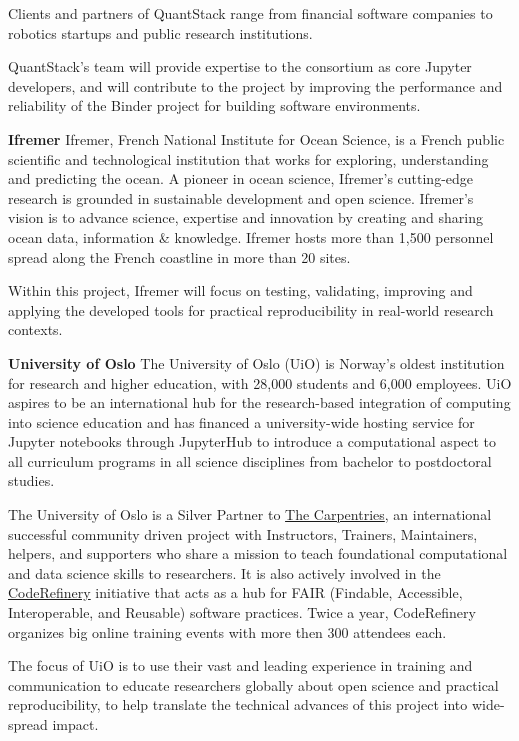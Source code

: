 Clients and partners of QuantStack range from financial software companies to robotics
startups and public research institutions.

QuantStack's team will provide expertise to the consortium as core Jupyter developers,
and will contribute to the project by improving the performance and reliability of the
Binder project for building software environments.

\noindent \textbf{Ifremer}
Ifremer, French National Institute for Ocean Science, is a French public
scientific and technological institution that works for exploring, understanding
and predicting the ocean. A pioneer in ocean science, Ifremer's cutting-edge
research is grounded in sustainable development and open science. Ifremer's
vision is to advance science, expertise and innovation by creating and sharing
ocean data, information \& knowledge. Ifremer hosts more than 1,500 personnel
spread along the French coastline in more than 20 sites.

Within this project, Ifremer will focus on testing, validating, improving and
applying the developed
tools for practical reproducibility in real-world research contexts.

\noindent \textbf{University of Oslo}
The University of Oslo (UiO) is Norway's oldest institution for research and
higher education, with 28,000 students and 6,000 employees. UiO aspires to be an
international hub for the research-based integration of computing into science
education and has financed a university-wide hosting service for Jupyter
notebooks through JupyterHub to introduce a computational aspect to all
curriculum programs in all science disciplines from bachelor to postdoctoral
studies.

The University of Oslo is a Silver Partner to \href{https://carpentries.org}{The
  Carpentries}, an international successful community driven project with
Instructors, Trainers, Maintainers, helpers, and supporters who share a mission
to teach foundational computational and data science skills to researchers. It
is also actively involved in the \href{https://coderefinery.org/}{CodeRefinery}
initiative that acts as a hub for FAIR (Findable, Accessible, Interoperable, and
Reusable) software practices. Twice a year, CodeRefinery organizes big online
training events with more then 300 attendees each.

The focus of UiO is to use their vast and leading experience in training
and communication to educate researchers globally about open science and
practical reproducibility, to help translate the technical advances of this
project into wide-spread impact.


